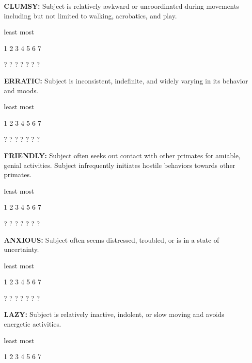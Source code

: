 \documentclass{article} %
\begin{document}
\noindent \textbf{ }

\noindent \textbf{CLUMSY:} Subject is relatively awkward or uncoordinated during movements including but not limited to walking, acrobatics, and play. 

\noindent  

\noindent least                            most

  1    2    3    4    5    6    7   

  ?    ?    ?    ?    ?    ?    ?   

\noindent  

\noindent \textbf{ERRATIC:} Subject is inconsistent, indefinite, and widely varying in its behavior and moods. 

\noindent  

\noindent least                            most

  1    2    3    4    5    6    7   

  ?    ?    ?    ?    ?    ?    ?   

\noindent  

\textbf{   }

\noindent \textbf{FRIENDLY:} Subject often seeks out contact with other primates for amiable, genial activities. Subject infrequently initiates hostile behaviors towards other primates. 

\noindent  

\noindent least                            most

  1    2    3    4    5    6    7   

  ?    ?    ?    ?    ?    ?    ?   

\noindent  

\noindent \textbf{ANXIOUS:} Subject often seems distressed, troubled, or is in a state of uncertainty. 

\noindent  

\noindent least                            most

  1    2    3    4    5    6    7   

  ?    ?    ?    ?    ?    ?    ?   

\noindent \textbf{ }

\noindent \textbf{LAZY:} Subject is relatively inactive, indolent, or slow moving and avoids energetic activities. 

\noindent  

\noindent least                            most

  1    2    3    4    5    6    7   
\end{document}
